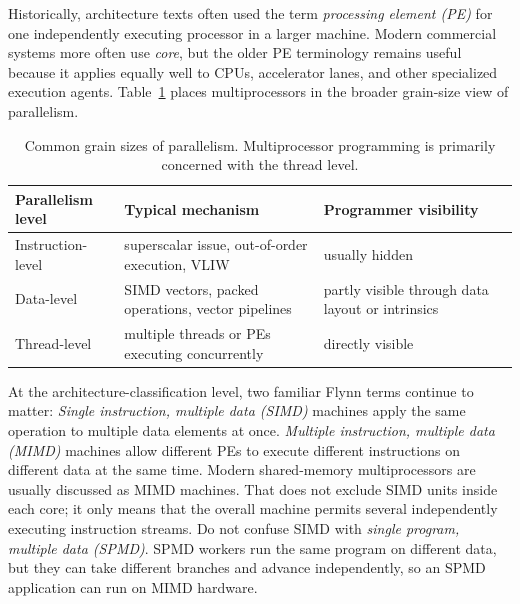 Historically, architecture texts often used the term \textit{processing element (PE)} for one independently executing processor in a larger machine.
Modern commercial systems more often use \textit{core}, but the older PE terminology remains useful because it applies equally well to CPUs, accelerator lanes, and other specialized execution agents.
Table~\ref{tab:mp-grain-size} places multiprocessors in the broader grain-size view of parallelism.
\begin{table}[!b]
    \centering
    \footnotesize
    \renewcommand{\arraystretch}{1.15}
    \begin{tabular}{|>{\raggedright\arraybackslash}p{1.15in}|>{\raggedright\arraybackslash}p{2.00in}|>{\raggedright\arraybackslash}p{1.55in}|}
        \hline
        Parallelism level & Typical mechanism                                 & Programmer visibility                            \\
        \hline
        Instruction-level & superscalar issue, out-of-order execution, VLIW   & usually hidden                                   \\
        \hline
        Data-level        & SIMD vectors, packed operations, vector pipelines & partly visible through data layout or intrinsics \\
        \hline
        Thread-level      & multiple threads or PEs executing concurrently    & directly visible                                 \\
        \hline
    \end{tabular}
    \caption{Common grain sizes of parallelism. Multiprocessor programming is primarily concerned with the thread level.}
    \label{tab:mp-grain-size}
\end{table}

At the architecture-classification level, two familiar Flynn terms continue to matter:
\textit{Single instruction, multiple data (SIMD)} machines apply the same operation to multiple data elements at once.
\textit{Multiple instruction, multiple data (MIMD)} machines allow different PEs to execute different instructions on different data at the same time.
Modern shared-memory multiprocessors are usually discussed as MIMD machines.
That does not exclude SIMD units inside each core; it only means that the overall machine permits several independently executing instruction streams.
Do not confuse SIMD with \textit{single program, multiple data (SPMD)}.
SPMD workers run the same program on different data, but they can take different branches and advance independently, so an SPMD application can run on MIMD hardware.


